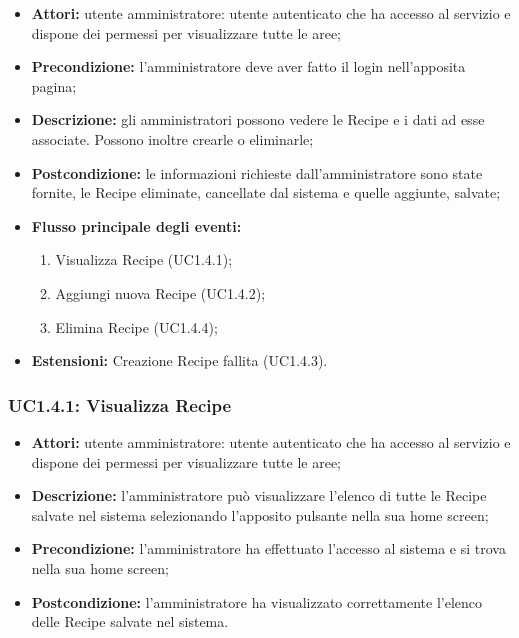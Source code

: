 \begin{itemize}
    \item \textbf{Attori:} utente amministratore: utente autenticato che ha accesso al servizio e dispone dei permessi per visualizzare tutte le aree;
    \item \textbf{Precondizione:} l'amministratore deve aver fatto il login nell'apposita pagina;
    \item \textbf{Descrizione:} gli amministratori possono vedere le Recipe e i dati ad esse associate. Possono inoltre crearle o eliminarle;
    \item \textbf{Postcondizione:} le informazioni richieste dall'amministratore sono state fornite, le Recipe eliminate, cancellate dal sistema e quelle aggiunte, salvate;
    \item \textbf{Flusso principale degli eventi:}
    \begin{enumerate}
        \item Visualizza Recipe (UC1.4.1);
        \item Aggiungi nuova Recipe (UC1.4.2);
        \item Elimina Recipe (UC1.4.4);
    \end{enumerate}
    \item \textbf{Estensioni:} Creazione Recipe fallita (UC1.4.3).
\end{itemize}

\subsubsection{UC1.4.1: Visualizza Recipe}

\begin{itemize}
    \item \textbf{Attori:} utente amministratore: utente autenticato che ha accesso al servizio e dispone dei permessi per visualizzare tutte le aree;
    \item \textbf{Descrizione:} l'amministratore può visualizzare l'elenco di tutte le Recipe salvate nel sistema selezionando l'apposito pulsante nella sua home screen;
    \item \textbf{Precondizione:} l'amministratore ha effettuato l'accesso al sistema e si trova nella sua home screen;
    \item \textbf{Postcondizione:} l'amministratore ha visualizzato correttamente l'elenco delle Recipe salvate nel sistema.
\end{itemize}

